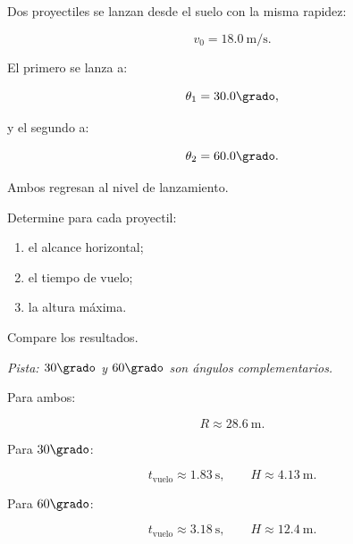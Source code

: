 \begin{ejercicio}
Dos proyectiles se lanzan desde el suelo con la misma rapidez:

\[
v_0=\SI{18.0}{\meter\per\second}.
\]

El primero se lanza a:

\[
\theta_1=30.0\grado,
\]

y el segundo a:

\[
\theta_2=60.0\grado.
\]

Ambos regresan al nivel de lanzamiento.

Determine para cada proyectil:

\begin{enumerate}[label=\alph*)]
    \item el alcance horizontal;
    \item el tiempo de vuelo;
    \item la altura máxima.
\end{enumerate}

Compare los resultados.

\textit{Pista: \(30\grado\) y \(60\grado\) son ángulos complementarios.}
\end{ejercicio}

\begin{respuesta}
Para ambos:

\[
\boxed{
R\approx\SI{28.6}{\meter}
}.
\]

Para \(30\grado\):

\[
t_{\mathrm{vuelo}}\approx\SI{1.83}{\second},
\qquad
H\approx\SI{4.13}{\meter}.
\]

Para \(60\grado\):

\[
t_{\mathrm{vuelo}}\approx\SI{3.18}{\second},
\qquad
H\approx\SI{12.4}{\meter}.
\]
\end{respuesta}

